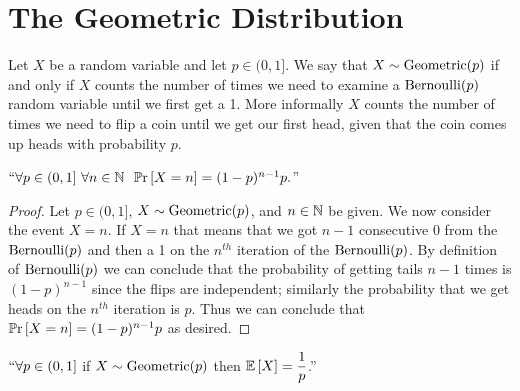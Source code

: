     \section{The Geometric Distribution}
        \begin{definition}
            Let $X$ be a random variable and let $p \in (0, 1]$. We say that $X \sim \mathrm{Geometric}(p)$
            if and only if $X$ counts the number of times we need to examine a $\mathrm{Bernoulli}(p)$ random
            variable until we first get a 1. More informally $X$ counts the number of times we need
            to flip a coin until we get our first head, given that the coin comes up heads with
            probability $p$.
        \end{definition}
        \begin{theorem}
            $``\forall p \in (0, 1] \ \forall n \in \mathbb{N} \ \ \mathbb{P}\mathrm{r} \left[X = n\right] = (1 - p)^{n - 1}p.$''
            \label{geopmf}
        \end{theorem}
        \begin{proof}
            Let $p \in (0, 1]$, $X \sim \mathrm{Geometric}(p)$, and $n \in \mathbb{N}$  be given. 
            We now consider the event $X = n$. If $X = n$ that means that we got $n - 1$
            consecutive 0 from the $\mathrm{Bernoulli}(p)$ and then a 1 on the $n^{th}$ iteration
            of the $\mathrm{Bernoulli}(p)$. By definition of $\mathrm{Bernoulli}(p)$ we can conclude that 
            the probability of getting tails $n - 1$ times is $(1 - p)^{n - 1}$ since
            the flips are independent; similarly the probability that we get heads on
            the $n^{th}$ iteration is $p$. Thus we can conclude that $\mathbb{P}\mathrm{r} \left[X = n\right] = (1 - p)^{n - 1}p$
            as desired. \QED
        \end{proof}
        \begin{theorem}
            $``\forall p \in (0, 1]$ if $X \sim \mathrm{Geometric}(p)$ then $\mathbb{E}\left[X\right] = \dfrac{1}{p}$.''
        \end{theorem}
